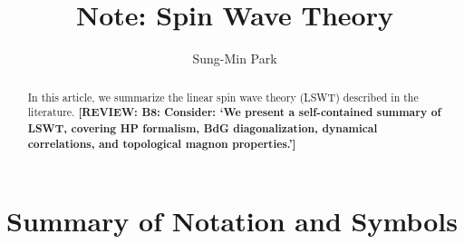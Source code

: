 \documentclass[aps, prx, nofootinbib, superscriptaddress]{revtex4-2}
\newcommand{\REVIEW}[1]{{\color{reviewcolor}\bfseries [REVIEW: #1]}}
\begin{document}
\title{Note: Spin Wave Theory}
\author{Sung-Min Park}
\begin{abstract}
    In this article, we summarize the linear spin wave theory (LSWT) described in the literature.
    \REVIEW{B8: Consider: `We present a self-contained summary of LSWT, covering HP formalism, BdG diagonalization, dynamical correlations, and topological magnon properties.'}
\end{abstract}
\maketitle

\tableofcontents

\newpage
\section*{Summary of Notation and Symbols}
\end{document}
